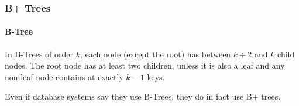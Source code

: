 \subsubsection{B+ Trees}
\paragraph{B-Tree}
In B-Trees of order $k$, each node (except the root) has between $k \div 2$ and $k$ child nodes.
The root node has at least two children, unless it is also a leaf and any non-leaf node contains at exactly $k - 1$ keys.

Even if database systems say they use B-Trees, they do in fact use B+ trees.
